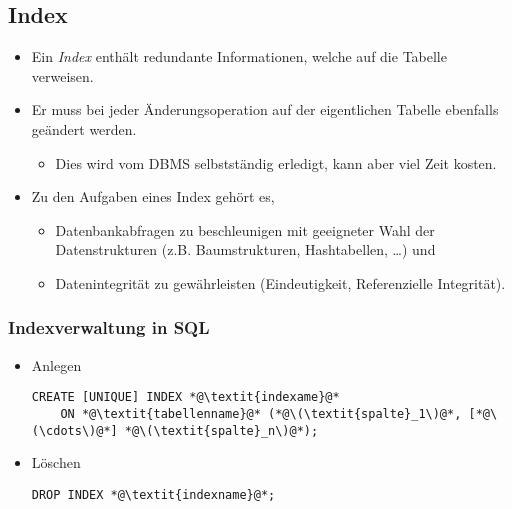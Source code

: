 \documentclass[a4paper, 11pt, accentcolor = tud3b]{tudreport}
\begin{document}
            \subsection{Index} %
                \begin{itemize}
                	\item Ein \textit{Index} enthält redundante Informationen, welche auf die Tabelle verweisen.
                	\item Er muss bei jeder Änderungsoperation auf der eigentlichen Tabelle ebenfalls geändert werden.
                		\begin{itemize}
                			\item Dies wird vom DBMS selbstständig erledigt, kann aber viel Zeit kosten.
                		\end{itemize}
                	\item Zu den Aufgaben eines Index gehört es,
                		\begin{itemize}
                			\item Datenbankabfragen zu beschleunigen mit geeigneter Wahl der Datenstrukturen (z.B. Baumstrukturen, Hashtabellen, \dots) und
                			\item Datenintegrität zu gewährleisten (Eindeutigkeit, Referenzielle Integrität).
                		\end{itemize}
                \end{itemize}

                \subsubsection{Indexverwaltung in SQL} %
                	\begin{itemize}
                		\item Anlegen
		                    \begin{lstlisting}
CREATE [UNIQUE] INDEX *@\textit{indexame}@*
	ON *@\textit{tabellenname}@* (*@\(\textit{spalte}_1\)@*, [*@\(\cdots\)@*] *@\(\textit{spalte}_n\)@*);
		                    \end{lstlisting}
		                \item Löschen
		                	\begin{lstlisting}
DROP INDEX *@\textit{indexname}@*;
		                	\end{lstlisting}
                    \end{itemize}
\end{document}
